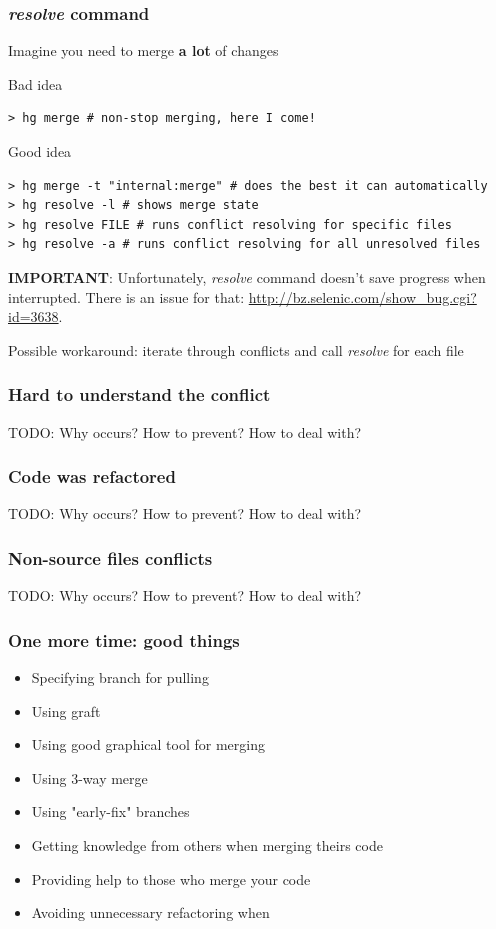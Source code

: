 \documentclass{beamer}
\begin{document}
\begin{frame}[fragile]
\frametitle{\textit{resolve} command}
Imagine you need to merge \textbf{a lot} of changes

\begin{exampleblock}{Bad idea}
\begin{verbatim}
> hg merge # non-stop merging, here I come!
\end{verbatim}
\end{exampleblock}

\begin{exampleblock}{Good idea}
\begin{Verbatim}[fontsize=\footnotesize]
> hg merge -t "internal:merge" # does the best it can automatically
> hg resolve -l # shows merge state
> hg resolve FILE # runs conflict resolving for specific files
> hg resolve -a # runs conflict resolving for all unresolved files
\end{Verbatim}
\end{exampleblock}
\textbf{IMPORTANT}: Unfortunately, \textit{resolve} command doesn't save progress when interrupted. There is an issue for that: \url{http://bz.selenic.com/show_bug.cgi?id=3638}. 

Possible workaround: iterate through conflicts and call \textit{resolve} for each file
\end{frame}

\begin{frame}
\frametitle{Hard to understand the conflict}
TODO: Why occurs? How to prevent? How to deal with? 
\end{frame}

\begin{frame}
\frametitle{Code was refactored}
TODO: Why occurs? How to prevent? How to deal with? 
\end{frame}

\begin{frame}
\frametitle{Non-source files conflicts}
TODO: Why occurs? How to prevent? How to deal with? 
\end{frame}


\begin{frame}
\frametitle{One more time: good things}
\begin{itemize}
\item Specifying branch for pulling
\item Using graft
\item Using good graphical tool for merging
\item Using 3-way merge
\item Using "early-fix" branches
\item Getting knowledge from others when merging theirs code
\item Providing help to those who merge your code
\item Avoiding unnecessary refactoring when
\end{itemize}
\end{frame}
\end{document}
